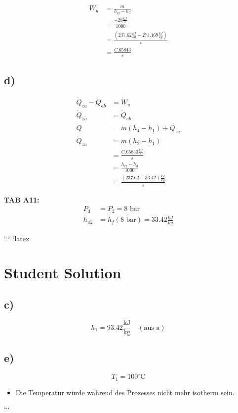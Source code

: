 \begin{align*}
    \dot{W}_u &= \frac{\dot{m}}{h_{i2} - h_3} \\
    &= \frac{-28 \frac{kJ}{s}}{1000} \\
    &= \frac{(237.62 \frac{kJ}{kg} - 274.169 \frac{kJ}{kg})}{s} \\
    &= \frac{C.65843}{s}
\end{align*}

\subsection*{d)}

\begin{align*}
    \dot{Q}_{zu} - \dot{Q}_{ab} &= \dot{W}_u \\
    \dot{Q}_{zu} &= \dot{Q}_{ab} \\
    Q &= \dot{m} (h_4 - h_1) + \dot{Q}_{zu} \\
    \dot{Q}_{zu} &= \dot{m} (h_2 - h_1) \\
    &= \frac{C.65843 \frac{kJ}{s}}{s} \\
    &= \frac{h_{i2} - h_3}{1000} \\
    &= \frac{(237.62 - 33.42) \frac{kJ}{kg}}{s}
\end{align*}

\textbf{TAB A11:}
\begin{align*}
    P_3 &= P_2 = 8 \text{ bar} \\
    h_{u2} &= h_f (8 \text{ bar}) = 33.42 \frac{kJ}{kg}
\end{align*}

``````latex


\section*{Student Solution}

\subsection*{c)}
\begin{equation*}
h_1 = 93.42 \frac{\text{kJ}}{\text{kg}} \quad (\text{aus a})
\end{equation*}

\subsection*{e)}
\begin{equation*}
T_1 = 100^\circ \text{C}
\end{equation*}
\begin{itemize}
    \item Die Temperatur würde während des Prozesses nicht mehr isotherm sein.
\end{itemize}

```
